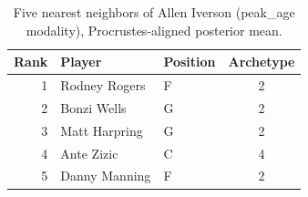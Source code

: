 \begin{table}[htbp]
  \centering\small
  \begin{tabular}{rllc}
    \toprule
    Rank & Player & Position & Archetype \\
    \midrule
    1 & Rodney Rogers & F & 2 \\
    2 & Bonzi Wells & G & 2 \\
    3 & Matt Harpring & G & 2 \\
    4 & Ante Zizic & C & 4 \\
    5 & Danny Manning & F & 2 \\
    \bottomrule
  \end{tabular}
  \caption{Five nearest neighbors of Allen Iverson (peak_age modality), Procrustes-aligned posterior mean.}
  \label{tab:Allen_Iverson_neighbors_peak_age}
\end{table}

